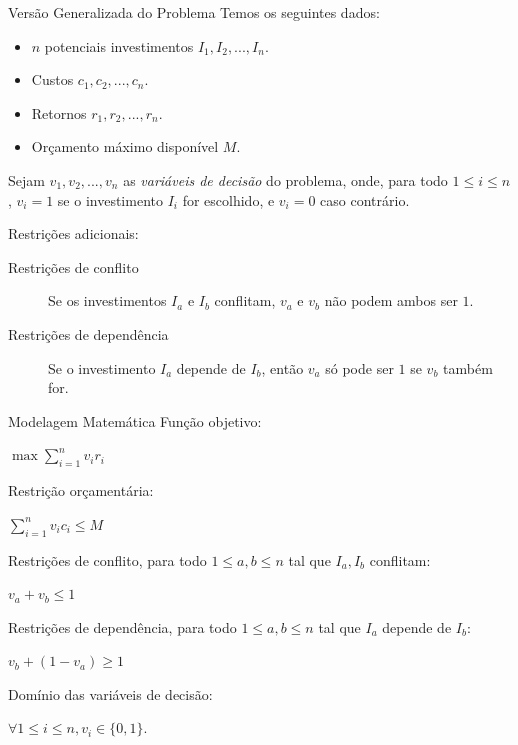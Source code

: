 \documentclass{beamer}
\begin{document}
\begin{frame}{Versão Generalizada do Problema}
Temos os seguintes dados: \pause
\begin{itemize}
\item $n$ potenciais investimentos $I_1,I_2,...,I_n$.\pause
\item Custos $c_1,c_2,...,c_n$.\pause
\item Retornos $r_1,r_2,...,r_n$.\pause
\item Orçamento máximo disponível $M$.\pause
\end{itemize}
Sejam $v_1,v_2,...,v_n$ as \emph{variáveis de decisão} do problema, onde,
para todo $ 1 \le i \le n$, $v_i = 1$ se o investimento $I_i$ for escolhido, e
$v_i = 0$ caso contrário.\pause

Restrições adicionais:\pause
\begin{description}
\item[Restrições de conflito] Se os investimentos $I_a$ e $I_b$ conflitam, $v_a$ e $v_b$ não podem ambos ser $1$.\pause
\item[Restrições de dependência] Se o investimento $I_a$ depende de $I_b$, então $v_a$ só pode ser $1$ se $v_b$ também for.\pause
\end{description}

\end{frame}

\begin{frame}{Modelagem Matemática}
Função objetivo:
\begin{center}
$\max \sum\limits_{i=1}^n v_ir_i$
\end{center}\pause
Restrição orçamentária:
\begin{center}
$\sum\limits_{i=1}^n v_ic_i \le M$
\end{center}\pause
Restrições de conflito, para todo $1 \le a,b \le n$ tal que $I_a,I_b$ conflitam:
\begin{center}
$v_a+v_b \le 1$
\end{center}\pause
Restrições de dependência, para todo $1 \le a,b \le n$ tal que $I_a$ depende de $I_b$:
\begin{center}
$v_b+(1-v_a) \ge 1$
\end{center}
Domínio das variáveis de decisão:
\begin{center}
$\forall 1 \le i \le n, v_i \in \{0,1\}$.
\end{center}
\end{frame}
\end{document}
